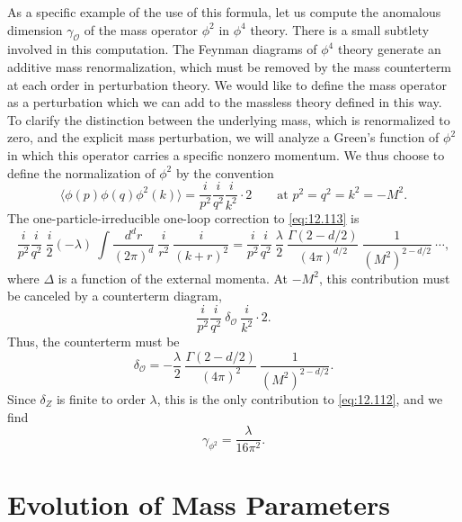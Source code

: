 As a specific example of the use of this formula, let us compute the
anomalous dimension $\gamma_{\mathcal{O}}$ of the mass operator $\phi^2$ in
$\phi^4$ theory.  There is a small subtlety involved in this computation.
The Feynman diagrams of $\phi^4$ theory generate an additive mass
renormalization, which must be removed by the mass counterterm at each order
in perturbation theory.  We would like to define the mass operator as a
perturbation which we can add to the massless theory defined in this way.  To
clarify the distinction between the underlying mass, which is renormalized to
zero, and the explicit mass perturbation, we will analyze a Green's function
of $\phi^2$ in which this operator carries a specific nonzero momentum.  We
thus choose to define the normalization of $\phi^2$ by the convention
\begin{equation}
  \bigl\langle \phi(p)\phi(q)\phi^2(k) \bigr\rangle
  = \frac{i}{p^2}\frac{i}{q^2}\frac{i}{k^2}\cdot 2
  \qquad\text{at } p^2 = q^2 = k^2 = -M^2 .
  \label{eq:12.113}
\end{equation}
The one-particle-irreducible one-loop correction to \eqref{eq:12.113} is
\begin{equation}
  \frac{i}{p^2}\frac{i}{q^2}\ \frac{i}{2}(-\lambda)\ \int
    \frac{d^dr}{(2\pi)^d}\ \frac{i}{r^2}\ \frac{i}{(k+r)^2}
  = \frac{i}{p^2}\frac{i}{q^2}\ \frac{\lambda}{2}\ \frac{\Gamma(2-d/2)}
    {(4\pi)^{d/2}}\ \frac{1}{(M^2)^{2-d/2}}\ \cdots ,
  \label{eq:12.114}
\end{equation}
where $\Delta$ is a function of the external momenta.  At $-M^2$, this
contribution must be canceled by a counterterm diagram,
\begin{equation}
  \frac{i}{p^2}\frac{i}{q^2}\ \delta_{\mathcal{O}}\ \frac{i}{k^2}\cdot 2 .
  \label{eq:12.115}
\end{equation}
Thus, the counterterm must be
\begin{equation}
  \delta_{\mathcal{O}} = -\frac{\lambda}{2}\ \frac{\Gamma(2-d/2)}
    {(4\pi)^2}\ \frac{1}{(M^2)^{2-d/2}} .
  \label{eq:12.116}
\end{equation}
Since $\delta_Z$ is finite to order $\lambda$, this is the only contribution
to \eqref{eq:12.112}, and we find
\begin{equation}
  \gamma_{\phi^2} = \frac{\lambda}{16\pi^2} .
  \label{eq:12.117}
\end{equation}

\section{Evolution of Mass Parameters}

